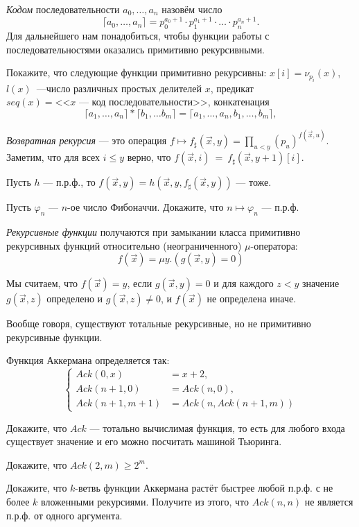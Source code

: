 \documentclass[a4paper, 12pt, num=Г1, date = 19.12.2018]{listok}
\renewcommand{\phi}{\varphi}
\begin{document}
\begin{definition}
	\textit{Кодом} последовательности $a_0, \dots, a_n$ назовём число
	\[
		\lceil a_0, \dots, a_n \rceil = p_0^{a_0 + 1} \cdot p_1^{a_1+1} \cdot \dots \cdot p_n^{a_n+1}.
	\]
	Для дальнейшего нам понадобиться, чтобы функции работы с последовательностями оказались примитивно рекурсивными.
\end{definition}
\begin{problem}
	Покажите, что следующие функции примитивно рекурсивны: $x[i] = \nu_{p_i}(x)$, $l(x)$~---число
	различных простых делителей $x$, предикат $seq(x) = \text{<<$x$ --- код последовательности>>}$, конкатенация
	\[
		\lceil a_1, \dots, a_n \rceil * \lceil b_1, \dots b_m \rceil = \lceil a_1, \dots, a_n, b_1, \dots, b_m \rceil,
	\]
\end{problem}
\begin{definition}
	\textit{Возвратная рекурсия} --- это операция $f \mapsto f_\sharp (\vec x, y) = \prod_{u < y} (p_u)^{f(\vec x, u)}$.
	Заметим, что для всех $i \le y$ верно, что $f(\vec x, i)~=~f_\sharp(\vec x, y + 1)[i].$
\end{definition}
\begin{problem}
	Пусть $h$ --- п.р.ф., то $f(\vec x, y) = h(\vec x, y, f_\sharp(\vec x, y))$ --- тоже.
\end{problem}
\begin{problem}
	Пусть $\phi_n$ --- $n$-ое число Фибоначчи.
	Докажите, что $n \mapsto \phi_n$ --- п.р.ф.
\end{problem}
\begin{definition}
	\textit{Рекурсивные функции}  получаются при замыкании класса примитивно рекурсивных
	функций относительно (неограниченного) $\mu$-оператора:
	\[
		f (\vec x) = \mu y.(g(\vec x, y) = 0)
	\]

	Мы считаем, что $f (\vec x) = y$, если $g(\vec x, y) = 0$ и для каждого $z < y$ значение $g(\vec x, z)$
	определено и $g(\vec x, z) \ne 0$, и $f (\vec x)$ не определена иначе.
\end{definition}
Вообще говоря, существуют тотальные рекурсивные, но не примитивно рекурсивные функции.
\begin{definition}
	Функция Аккермана определяется так:
	\[
	\left \{
	\begin{aligned}
		Ack(0, x) &= x + 2,\\
		Ack(n + 1, 0) &= Ack(n, 0), \\
		Ack(n + 1, m + 1) &= Ack(n, Ack(n + 1, m))
	\end{aligned}
	\right .
	\]
\end{definition}
\begin{problem}
	Докажите, что $Ack$ --- тотально вычислимая функция, то есть для любого входа существует значение и его можно посчитать машиной Тьюринга.
\end{problem}
\begin{problem}
	Докажите, что $Ack(2, m) \ge 2^m$.
\end{problem}
\begin{problem}[${}^\star$]
	Докажите, что $k$-ветвь функции Аккермана растёт быстрее любой п.р.ф. с не более $k$ вложенными рекурсиями.
	Получите из этого, что $Ack(n, n)$ не является п.р.ф. от одного аргумента.
\end{problem}
\end{document}
